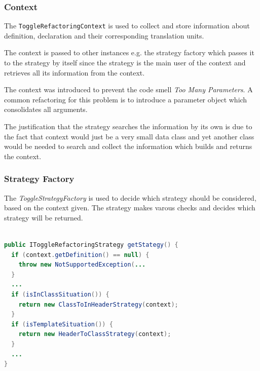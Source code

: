 \subsubsection{Context}

The \texttt{ToggleRefactoringContext} is used to collect and store information 
about definition, declaration and their corresponding translation units.

The context is passed to other instances e.g. the strategy factory which
passes it to the strategy by itself since the strategy is the main user of the
context and retrieves all its information from the context.

The context was introduced to prevent the code smell \textit{Too Many 
Parameters}\cite{cwiki}. A common refactoring for this problem is to introduce a 
parameter object which consolidates all arguments.

The justification that the strategy searches the information by its own is due
to the fact that context would just be a very small data class and yet another
class would be needed to search and collect the information which builds and
returns the context.

\subsubsection{Strategy Factory}

The \textit{ToggleStrategyFactory} is used to decide which strategy should be 
considered, based on the context given. The strategy makes varous checks
and decides which strategy will be returned.

\begin{lstlisting}[caption={IToggleRefactoringStrategy},
label={strategy}, language=Java]

public IToggleRefactoringStrategy getStategy() {
  if (context.getDefinition() == null) {
    throw new NotSupportedException(...
  }
  ...
  if (isInClassSituation()) {
    return new ClassToInHeaderStrategy(context);
  }
  if (isTemplateSituation()) {
    return new HeaderToClassStrategy(context);
  }
  ...
}
\end{lstlisting}

